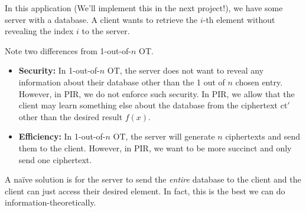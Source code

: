 \begin{example}
    In this application (We'll implement this in the next project!), we have some server with a database. A client wants to retrieve the $i$-th element without revealing the index $i$ to the server.


    Note two differences from 1-out-of-$n$ OT.
    \begin{itemize}
        \item \textbf{Security:} In 1-out-of-$n$ OT, the server does not want to reveal any information about their database other than the 1 out of $n$ chosen entry. However, in PIR, we do not enforce such security. In PIR, we allow that the client may learn something else about the database from the ciphertext ct$'$ other than the desired result $f(x)$.
        \item \textbf{Efficiency:} In 1-out-of-$n$ OT, the server will generate $n$ ciphertexts and send them to the client. However, in PIR, we want to be more succinct and only send one ciphertext.
    \end{itemize}

    A na\"ive solution is for the server to send the \emph{entire} database to the client and the client can just access their desired element. In fact, this is the best we can do information-theoretically.

\end{example}

